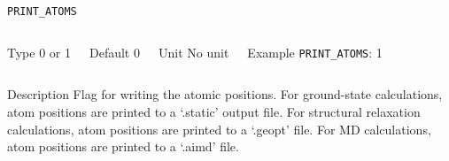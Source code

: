 \documentclass[xcolor=dvipsnames,t]{beamer}
\begin{document}
\begin{frame}[allowframebreaks]{\texttt{PRINT\_ATOMS}} \label{PRINT_ATOMS}
\vspace*{-12pt}
\begin{columns}
\begin{block}{Type}
0 or 1
\end{block}

\begin{block}{Default}
0
\end{block}

\begin{block}{Unit}
No unit
\end{block}

\begin{block}{Example}
\texttt{PRINT\_ATOMS}: 1
\end{block}
\end{columns}

\begin{block}{Description}
Flag for writing the atomic positions. For ground-state calculations, atom positions are printed to a `.static' output file. For structural relaxation calculations, atom positions are printed to a `.geopt' file. For MD calculations, atom positions are printed to a `.aimd' file.
\end{block}


\end{frame}
\end{document}
